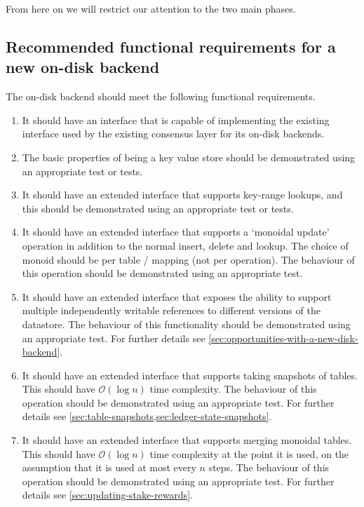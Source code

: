 \documentclass[11pt,a4paper]{article}
\begin{document}
From here on we will restrict our attention to the two main phases.

\subsection{Recommended functional requirements for a new on-disk backend}

The on-disk backend should meet the following functional requirements.

\begin{enumerate}
\item It should have an interface that is capable of implementing the existing
      interface used by the existing consensus layer for its on-disk backends.

\item The basic properties of being a key value store should be demonstrated
      using an appropriate test or tests.

\item It should have an extended interface that supports key-range lookups, and
      this should be demonstrated using an appropriate test or tests.

\item It should have an extended interface that supports a `monoidal update'
      operation in addition to the normal insert, delete and lookup. The choice
      of monoid should be per table / mapping (not per operation). The behaviour
      of this operation should be demonstrated using an appropriate test.

\item It should have an extended interface that exposes the ability to support
      multiple independently writable references to different versions of the
      datastore. The behaviour of this functionality should be demonstrated
      using an appropriate test. For further details see
      \cref{sec:opportunities-with-a-new-disk-backend}.

\item It should have an extended interface that supports taking snapshots of
      tables. This should have $\mathcal{O}(\log n)$ time complexity. The
      behaviour of this operation should be demonstrated using an appropriate
      test. For further details see
      \cref{sec:table-snapshots,sec:ledger-state-snapshots}.

\item It should have an extended interface that supports merging monoidal tables.
      This should have $\mathcal{O}(\log n)$ time complexity at the point it is
      used, on the assumption that it is used at most every $n$ steps. The
      behaviour of this operation should be demonstrated using an appropriate
      test. For further details see \cref{sec:updating-stake-rewards}.


\end{enumerate}
\end{document}
